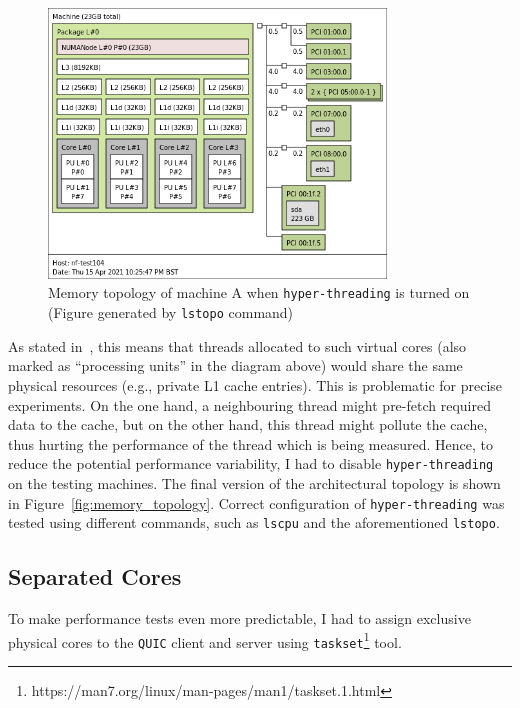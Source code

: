 \documentclass[12pt,a4paper]{report}
\begin{document}
    \begin{figure}[H]
    \centering
    \includegraphics[width=0.8\textwidth]{figs/topology_with_hyperthreading.png}
    \caption[Memory topology of machine A when \texttt{hyper-threading} is turned on]{Memory topology of machine A when \texttt{hyper-threading} is turned on (Figure generated by \texttt{lstopo} command)}
    \label{fig:topology_with_hyperthreading}
    \end{figure}

As stated in~\cite{hyperthreading_book}, this means that threads allocated to such virtual cores (also marked as \enquote{processing units} in the diagram above) would share the same physical resources (e.g., private L1 cache entries).
This is problematic for precise experiments.
On the one hand, a neighbouring thread might pre-fetch required data to the cache, but on the other hand, this thread might pollute the cache, thus hurting the performance of the thread which is being measured.
Hence, to reduce the potential performance variability, I had to disable \texttt{hyper-threading} on the testing machines.
The final version of the architectural topology is shown in Figure~\ref{fig:memory_topology}. 
Correct configuration of \texttt{hyper-threading} was tested using different commands, such as \texttt{lscpu} and the aforementioned \texttt{lstopo}. 

    
    
\subsection{Separated Cores} \label{SeparatedCores_Subsection_Tag}
To make performance tests even more predictable, I had to assign exclusive physical cores to the \texttt{QUIC} client and server using \texttt{taskset}\footnote{https://man7.org/linux/man-pages/man1/taskset.1.html} tool.
\end{document}
